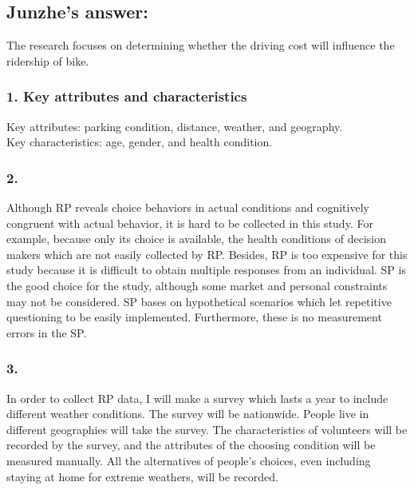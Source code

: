 \documentclass[11pt]{article}
\begin{document}
\subsection*{Junzhe's answer:}
The research focuses on determining whether the driving cost will influence the ridership of bike. 
\subsubsection*{1. Key attributes and characteristics}
Key attributes: parking condition, distance, weather, and geography.\\
Key characteristics: age, gender, and health condition.
\subsubsection*{2.}
Although RP reveals choice behaviors in actual conditions and cognitively congruent with actual behavior, it is hard to be collected in this study.  For example, because only its choice is available, the health conditions of decision makers which are not easily collected by RP.  Besides, RP is too expensive for this study because it is difficult to obtain multiple responses from an individual. SP is the good choice for the study, although some market and personal constraints may not be considered. SP bases on hypothetical scenarios which let repetitive questioning to be easily implemented. Furthermore, these is no measurement errors in the SP. 
\subsubsection*{3.}
In order to collect RP data, I will make a survey which lasts a year to include different weather conditions. The survey will be nationwide. People live in different geographies will take the survey. The characteristics of volunteers will be recorded by the survey, and the attributes of the choosing condition will be measured manually. All the alternatives of people’s choices, even including staying at home for extreme weathers, will be recorded.
\end{document}
